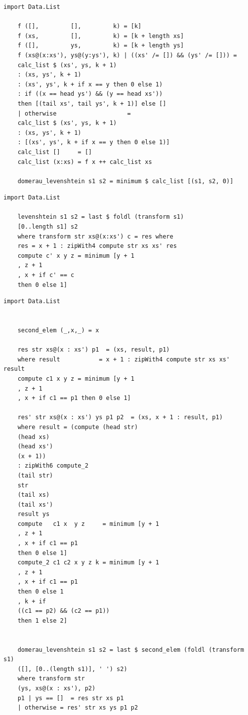 \documentclass[12pt]{report}
\begin{document}
    \begin{lstlisting}[label=some-code1,caption=Функция нахождения расстояния Дамерау-Левенштейна рекурсивно]
    import Data.List

    f ([],         [],         k) = [k]
    f (xs,         [],         k) = [k + length xs]
    f ([],         ys,         k) = [k + length ys]
    f (xs@(x:xs'), ys@(y:ys'), k) | ((xs' /= []) && (ys' /= [])) =
    calc_list $ (xs', ys, k + 1)
    : (xs, ys', k + 1) 
    : (xs', ys', k + if x == y then 0 else 1) 
    : if ((x == head ys') && (y == head xs'))
    then [(tail xs', tail ys', k + 1)] else []
    | otherwise                    = 
    calc_list $ (xs', ys, k + 1) 
    : (xs, ys', k + 1)
    : [(xs', ys', k + if x == y then 0 else 1)]
    calc_list []     = []
    calc_list (x:xs) = f x ++ calc_list xs
    
    domerau_levenshtein s1 s2 = minimum $ calc_list [(s1, s2, 0)]
    \end{lstlisting}
    
    \begin{lstlisting}[label=some-code2,caption=Функция нахождения расстояния Левенштейна матрично]
    import Data.List
    
    levenshtein s1 s2 = last $ foldl (transform s1) 
    [0..length s1] s2
    where transform str xs@(x:xs') c = res where
    res = x + 1 : zipWith4 compute str xs xs' res
    compute c' x y z = minimum [y + 1
    , z + 1
    , x + if c' == c 
    then 0 else 1]
    \end{lstlisting}
    
    \begin{lstlisting}[label=some-code3,caption=Функция нахождения расстояния Дамерау-Левенштейна матрично]
    import Data.List
    
    
    second_elem (_,x,_) = x
    
    res str xs@(x : xs') p1  = (xs, result, p1)
    where result           = x + 1 : zipWith4 compute str xs xs' result
    compute c1 x y z = minimum [y + 1
    , z + 1
    , x + if c1 == p1 then 0 else 1]
    
    res' str xs@(x : xs') ys p1 p2  = (xs, x + 1 : result, p1)
    where result = (compute (head str) 
    (head xs) 
    (head xs') 
    (x + 1))
    : zipWith6 compute_2 
    (tail str) 
    str 
    (tail xs) 
    (tail xs') 
    result ys
    compute   c1 x  y z     = minimum [y + 1
    , z + 1
    , x + if c1 == p1
    then 0 else 1]
    compute_2 c1 c2 x y z k = minimum [y + 1
    , z + 1
    , x + if c1 == p1
    then 0 else 1
    , k + if 
    ((c1 == p2) && (c2 == p1))
    then 1 else 2]
    
    
    domerau_levenshtein s1 s2 = last $ second_elem (foldl (transform s1) 
    ([], [0..(length s1)], ' ') s2)
    where transform str 
    (ys, xs@(x : xs'), p2) 
    p1 | ys == []  = res str xs p1
    | otherwise = res' str xs ys p1 p2
    \end{lstlisting}
    
\end{document}
